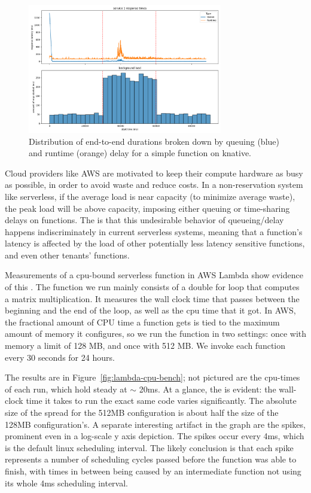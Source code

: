 \begin{figure}[t!]
    \centering
      \includegraphics[width=8.5cm]{img/knative_loadexp_times.png}
      \caption{Distribution of end-to-end durations broken down by
        queuing (blue) and runtime (orange) delay for a simple function on
        knative.}
    \label{fig:knative}
\end{figure}

Cloud providers like AWS are motivated to keep their compute hardware as busy as
possible, in order to avoid waste and reduce costs. In a non-reservation system
like serverless, if the average load is near capacity (to minimize average
waste), the peak load will be above capacity, imposing either queuing or
time-sharing delays on functions. The \problem{} is that this undesirable
behavior of queueing/delay happens indiscriminately in current serverless
systems, meaning that a function's latency is affected by the load of other
potentially less latency sensitive functions, and even other tenants' functions.

Measurements of a cpu-bound serverless function in AWS Lambda show evidence of
this \problem{}. The function we run mainly consists of a double for loop that
computes a matrix multiplication. It measures the wall clock time that passes
between the beginning and the end of the loop, as well as the cpu time that it
got. In AWS, the fractional amount of CPU time a function gets is tied to the
maximum amount of memory it configures, so we run the function in two settings:
once with memory a limit of 128 MB, and once with 512 MB. We invoke each
function every 30 seconds for 24 hours.

The results are in Figure~\ref{fig:lambda-cpu-bench}; not pictured are the
cpu-times of each run, which hold steady at $\sim$ 20ms. At a glance, the
\problem{} is evident: the wall-clock time it takes to run the exact same code
varies significantly. The absolute size of the spread for the 512MB
configuration is about half the size of the 128MB configuration's.
 A separate
interesting artifact in the graph are the spikes, prominent even in a log-scale
y axis depiction. The spikes occur every 4ms, which is the default linux
scheduling interval. The likely conclusion is that each spike represents a
number of scheduling cycles passed before the function was able to finish, with
times in between being caused by an intermediate function not using its whole
4ms scheduling interval.


